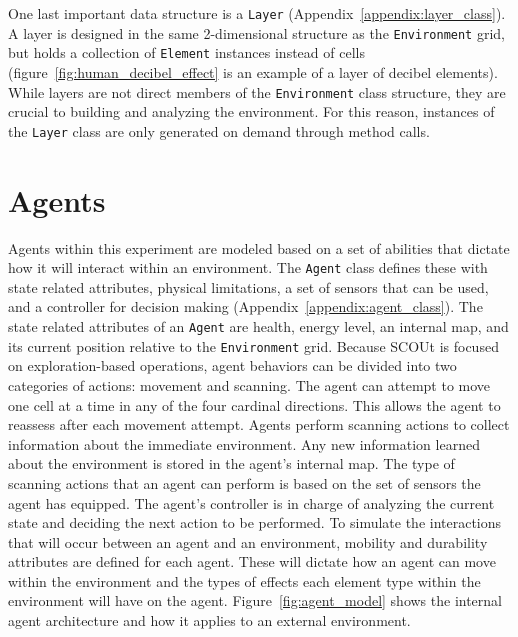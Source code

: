 One last important data structure is a \texttt{Layer} (Appendix~\ref{appendix:layer_class}).
A layer is designed in the same 2-dimensional structure as the \texttt{Environment} grid, but holds a collection of \texttt{Element} instances instead of cells (figure~\ref{fig:human_decibel_effect} is an example of a layer of decibel elements).
While layers are not direct members of the \texttt{Environment} class structure, they are crucial to building and analyzing the environment.
For this reason, instances of the \texttt{Layer} class are only generated on demand through method calls.


\section{Agents} \label{sec:agent}
Agents within this experiment are modeled based on a set of abilities that dictate how it will interact within an environment.
The \texttt{Agent} class defines these with state related attributes, physical limitations, a set of sensors that can be used, and a controller for decision making (Appendix~\ref{appendix:agent_class}).
The state related attributes of an \texttt{Agent} are health, energy level, an internal map, and its current position relative to the \texttt{Environment} grid.
Because SCOUt is focused on exploration-based operations, agent behaviors can be divided into two categories of actions: movement and scanning.
The agent can attempt to move one cell at a time in any of the four cardinal directions.
This allows the agent to reassess after each movement attempt.
Agents perform scanning actions to collect information about the immediate environment.
Any new information learned about the environment is stored in the agent's internal map.
The type of scanning actions that an agent can perform is based on the set of sensors the agent has equipped.
The agent's controller is in charge of analyzing the current state and deciding the next action to be performed.
To simulate the interactions that will occur between an agent and an environment, mobility and durability attributes are defined for each agent.
These will dictate how an agent can move within the environment and the types of effects each element type within the environment will have on the agent.
Figure~\ref{fig:agent_model} shows the internal agent architecture and how it applies to an external environment.

